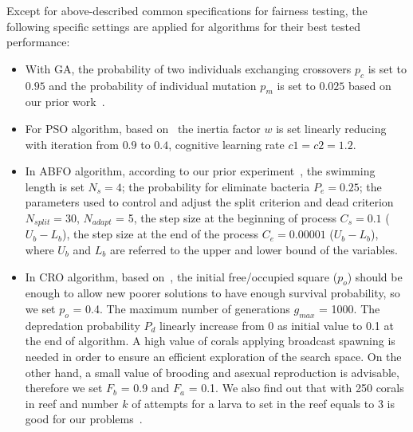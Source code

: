 \documentclass[review,3p,authoryear]{elsarticle}
\begin{document}
Except for above-described common specifications for fairness testing, the following specific settings are applied for algorithms for their best tested performance:
\begin{itemize}

\item With GA, 
the probability of two individuals exchanging crossovers $p_c$ is set to $0.95$ and 
the probability of individual mutation $p_m$ is set to $0.025$ based on our prior work~\citep{ref_thieu}. 

\item For PSO algorithm, based on~\citep{ref_shi2001particle} the inertia factor $w$ is set linearly reducing with iteration from $0.9$ to $0.4$, cognitive learning rate $c1 = c2 = 1.2$.

\item In ABFO algorithm, according to our prior experiment~\cite{ref_thieu},
the swimming length is set $N_s=4$;  
the probability for eliminate bacteria $P_e=0.25$; 
the parameters used to control and adjust the split criterion and dead criterion $N_{split}=30$, $N_{adapt}$ = 5, 
the step size at the beginning of process $C_s= 0.1$ ($U_b - L_b$), 
the step size at the end of the process $C_e=0.00001$ ($U_b - L_b$), where $U_b$ and $L_b$ are referred to the upper and lower bound of the variables. 

\item In CRO algorithm, based on~\citep{ref_salcedo_sanz1}, 
the initial free/occupied square ($p_{o}$) should be enough to allow new poorer solutions to have enough survival probability, so we set $p_{o}$ = 0.4. 
The maximum number of generations $g_{max}$ = 1000. 
The depredation probability $P_{d}$ linearly increase from 0 as initial value to 0.1 at the end of algorithm. 
A high value of corals applying broadcast spawning is needed in order to ensure an efficient exploration of the search space. On the other hand, a small value of brooding and asexual reproduction is advisable, therefore we set $F_{b}$ = 0.9 and $F_{a}$ = 0.1. 
We also find out that with 250 corals in reef and number $k$ of attempts for a larva to set in the reef equals to 3 is good for our problems~\citep{ref_salcedo_sanz1}.
 

\end{itemize}
\end{document}
